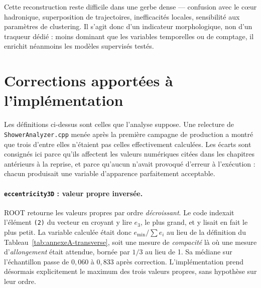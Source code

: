 Cette reconstruction reste difficile dans une gerbe dense — confusion avec le cœur hadronique, superposition de trajectoires, inefficacités locales, sensibilité aux paramètres de clustering. Il s'agit donc d'un indicateur morphologique, non d'un traqueur dédié : moins dominant que les variables temporelles ou de comptage, il enrichit néanmoins les modèles supervisés testés.

\section{Corrections apportées à l'implémentation}
\label{annexe:showeranalyzer-corrections}

Les définitions ci-dessus sont celles que l'analyse suppose. Une relecture de \texttt{ShowerAnalyzer.cpp} menée après la première campagne de production a montré que trois d'entre elles n'étaient pas celles effectivement calculées. Les écarts sont consignés ici parce qu'ils affectent les valeurs numériques citées dans les chapitres antérieurs à la reprise, et parce qu'aucun n'avait provoqué d'erreur à l'exécution : chacun produisait une variable d'apparence parfaitement acceptable.

\paragraph{\texttt{eccentricity3D} : valeur propre inversée.} ROOT retourne les valeurs propres par ordre \emph{décroissant}. Le code indexait l'élément \texttt{(2)} du vecteur en croyant y lire \(e_3\), le plus grand, et y lisait en fait le plus petit. La variable calculée était donc \(e_{\min}/\sum e_i\) au lieu de la définition du Tableau~\ref{tab:annexeA-transverse}, soit une mesure de \emph{compacité} là où une mesure d'\emph{allongement} était attendue, bornée par \(1/3\) au lieu de 1. Sa médiane sur l'échantillon passe de \(0{,}060\) à \(0{,}833\) après correction. L'implémentation prend désormais explicitement le maximum des trois valeurs propres, sans hypothèse sur leur ordre.

